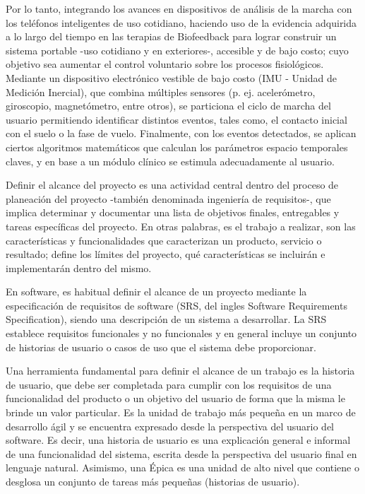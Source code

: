 Por lo tanto, integrando los avances en dispositivos de análisis de la marcha con los teléfonos inteligentes de uso cotidiano, haciendo uso de la evidencia adquirida a lo largo del tiempo en las terapias de Biofeedback para lograr construir un sistema portable -uso cotidiano y en exteriores-, accesible y de bajo costo; cuyo objetivo sea aumentar el control voluntario sobre los procesos fisiológicos. Mediante un dispositivo electrónico vestible de bajo costo (IMU - Unidad de Medición Inercial), que combina múltiples sensores (p. ej. acelerómetro, giroscopio, magnetómetro, entre otros), se particiona el ciclo de marcha del usuario permitiendo identificar distintos eventos, tales como, el contacto inicial con el suelo o la fase de vuelo. Finalmente, con los eventos detectados, se aplican ciertos algoritmos matemáticos que calculan los parámetros espacio temporales claves, y en base a un módulo clínico se estimula adecuadamente al usuario.

Definir el alcance del proyecto es una actividad central dentro del proceso de planeación del proyecto -también denominada ingeniería de requisitos-, que implica determinar y documentar una lista de objetivos finales, entregables y tareas específicas del proyecto. En otras palabras, es el trabajo a realizar, son las características y funcionalidades que caracterizan un producto, servicio o resultado; define los límites del proyecto, qué características se incluirán e implementarán dentro del mismo. 

En software, es habitual definir el alcance de un proyecto mediante la especificación de requisitos de software (SRS, del ingles Software Requirements Specification), siendo una descripción de un sistema a desarrollar. La SRS establece requisitos funcionales y no funcionales y en general incluye un conjunto de historias de usuario o casos de uso que el sistema debe proporcionar. 

Una herramienta fundamental para definir el alcance de un trabajo es la historia de usuario, que debe ser completada para cumplir con los requisitos de una funcionalidad del producto o un objetivo del usuario de forma que la misma le brinde un valor particular. Es la unidad de trabajo más pequeña en un marco de desarrollo ágil y se encuentra expresado desde la perspectiva del usuario del software. Es decir, una historia de usuario es una explicación general e informal de una funcionalidad del sistema, escrita desde la perspectiva del usuario final en lenguaje natural. Asimismo, una Épica es una unidad de alto nivel que contiene o desglosa un conjunto de tareas más pequeñas (historias de usuario).


